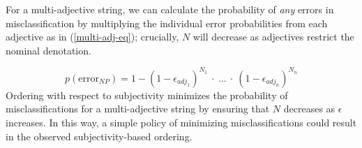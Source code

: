 \documentclass[preprint,authoryear]{elsarticle}\frenchspacing
\begin{document}
For a multi-adjective string, we can calculate the probability of \emph{any} errors in misclassification by multiplying the individual error probabilities from each adjective as in (\ref{multi-adj-eq}); crucially, $N$ will decrease as adjectives restrict the nominal denotation. 

\begin{equation} \label{multi-adj-eq}
p(\textrm{error}_{N\!P}) = 1 - (1-\epsilon_{adj_1})^{N_1}\ \cdot\ \ldots\ \cdot\ (1-\epsilon_{adj_n})^{N_n}
\end{equation}
Ordering with respect to subjectivity minimizes the probability of misclassifications for a multi-adjective string by ensuring that $N$ decreases as $\epsilon$ increases. In this way, a simple policy of minimizing misclassifications could result in the observed subjectivity-based ordering. 

%
%
%
%
%
%
\end{document}
